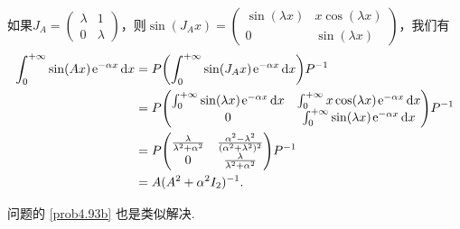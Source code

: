 \begin{solution}
\begin{inparaenum}[(a)]
        如果$J_A=\begin{pmatrix}
          \lambda & 1 \\
          0 & \lambda
        \end{pmatrix}$，则$\sin(J_Ax)=\begin{pmatrix}
          \sin(\lambda x) & x\cos(\lambda x) \\
          0 & \sin(\lambda x)
        \end{pmatrix}$，我们有
        \begin{align*}
          \int_0^{+\infty}\sin(Ax)\ee^{-\alpha x}\dif x & = P \left( \int_0^{+\infty} \sin(J_Ax) \ee^{-\alpha x} \dif x\right) P^{-1} \\
          & = P \begin{pmatrix}
            \int_0^{+\infty}\sin(\lambda x)\ee^{-\alpha x}\dif x & \int_0^{+\infty}x\cos(\lambda x)\ee^{-\alpha x}\dif x \\
            0 & \int_0^{+\infty}\sin(\lambda x)\ee^{-\alpha x}\dif x
          \end{pmatrix} P^{-1} \\
          & = P \begin{pmatrix}
            \frac\lambda{\lambda^2+\alpha^2} & \frac{\alpha^2-\lambda^2}{(\alpha^2+\lambda^2)^2}\\
            0 & \frac\lambda{\lambda^2+\alpha^2}
          \end{pmatrix}P^{-1} \\
          & = A(A^2+\alpha^2 I_2)^{-1}.
        \end{align*}

        问题的 \ref{prob4.93b} 也是类似解决.
  \end{inparaenum}
\end{solution}

